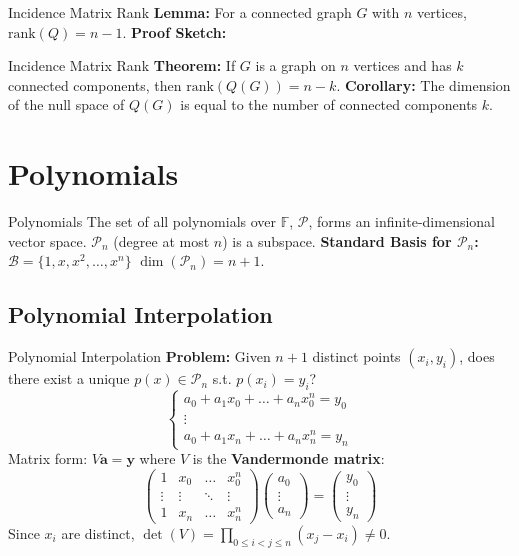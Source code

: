 \documentclass{beamer}
\begin{document}
\begin{frame}{Incidence Matrix Rank}
    \textbf{Lemma:} For a connected graph $G$ with $n$ vertices, $\text{rank}(Q) = n-1$.
    \vfill
    \textbf{Proof Sketch:}
    \vspace{2cm}
\end{frame}

\begin{frame}{Incidence Matrix Rank}
    \textbf{Theorem:} If $G$ is a graph on $n$ vertices and has $k$ connected components, then $\text{rank}(Q(G)) = n - k$.
    \vfill
    \textbf{Corollary:} The dimension of the null space of $Q(G)$ is equal to the number of connected components $k$.
\end{frame}
\begin{frame}{}
\end{frame}

\section{Polynomials}
\begin{frame}{Polynomials}
    The set of all polynomials over $\mathbb{F}$, $\mathcal{P}$, forms an infinite-dimensional vector space.
    $\mathcal{P}_n$ (degree at most $n$) is a subspace.
    \vfill
    \textbf{Standard Basis for $\mathcal{P}_n$:}
    $\mathcal{B} = \{1, x, x^2, \dots, x^n\}$
    $\dim(\mathcal{P}_n) = n+1$.
\end{frame}

\subsection{Polynomial Interpolation}
\begin{frame}{Polynomial Interpolation}
    \textbf{Problem:} Given $n+1$ distinct points $(x_i, y_i)$, does there exist a unique $p(x) \in \mathcal{P}_n$ s.t. $p(x_i) = y_i$?
    \[
        \begin{cases}
            a_0 + a_1 x_0 + \dots + a_n x_0^n = y_0 \\
            \vdots                                  \\
            a_0 + a_1 x_n + \dots + a_n x_n^n = y_n
        \end{cases}
    \]
    Matrix form: $V\mathbf{a} = \mathbf{y}$ where $V$ is the \textbf{Vandermonde matrix}:
    \[ \begin{pmatrix} 1 & x_0 & \dots & x_0^n \\ \vdots & \vdots & \ddots & \vdots \\ 1 & x_n & \dots & x_n^n \end{pmatrix} \begin{pmatrix} a_0 \\ \vdots \\ a_n \end{pmatrix} = \begin{pmatrix} y_0 \\ \vdots \\ y_n \end{pmatrix} \]
    Since $x_i$ are distinct, $\det(V) = \prod_{0 \le i < j \le n} (x_j - x_i) \neq 0$.
\end{frame}
\end{document}
